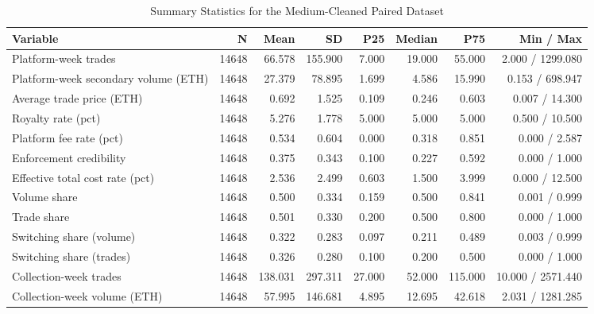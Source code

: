 \begin{table}[htbp]
\centering
\caption{Summary Statistics for the Medium-Cleaned Paired Dataset}
\label{tab:summary_stats}
\begin{tabular}{lrrrrrrr}
\hline
Variable & N & Mean & SD & P25 & Median & P75 & Min / Max \\
\hline
Platform-week trades & 14648 & 66.578 & 155.900 & 7.000 & 19.000 & 55.000 & 2.000 / 1299.080 \\
Platform-week secondary volume (ETH) & 14648 & 27.379 & 78.895 & 1.699 & 4.586 & 15.990 & 0.153 / 698.947 \\
Average trade price (ETH) & 14648 & 0.692 & 1.525 & 0.109 & 0.246 & 0.603 & 0.007 / 14.300 \\
Royalty rate (pct) & 14648 & 5.276 & 1.778 & 5.000 & 5.000 & 5.000 & 0.500 / 10.500 \\
Platform fee rate (pct) & 14648 & 0.534 & 0.604 & 0.000 & 0.318 & 0.851 & 0.000 / 2.587 \\
Enforcement credibility & 14648 & 0.375 & 0.343 & 0.100 & 0.227 & 0.592 & 0.000 / 1.000 \\
Effective total cost rate (pct) & 14648 & 2.536 & 2.499 & 0.603 & 1.500 & 3.999 & 0.000 / 12.500 \\
Volume share & 14648 & 0.500 & 0.334 & 0.159 & 0.500 & 0.841 & 0.001 / 0.999 \\
Trade share & 14648 & 0.501 & 0.330 & 0.200 & 0.500 & 0.800 & 0.000 / 1.000 \\
Switching share (volume) & 14648 & 0.322 & 0.283 & 0.097 & 0.211 & 0.489 & 0.003 / 0.999 \\
Switching share (trades) & 14648 & 0.326 & 0.280 & 0.100 & 0.200 & 0.500 & 0.000 / 1.000 \\
Collection-week trades & 14648 & 138.031 & 297.311 & 27.000 & 52.000 & 115.000 & 10.000 / 2571.440 \\
Collection-week volume (ETH) & 14648 & 57.995 & 146.681 & 4.895 & 12.695 & 42.618 & 2.031 / 1281.285 \\
\hline
\end{tabular}
\end{table}